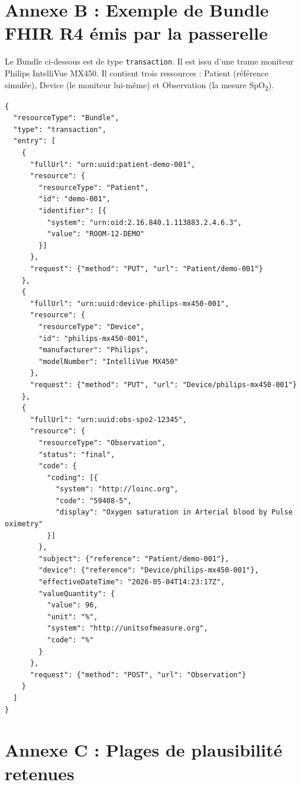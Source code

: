 \section*{Annexe B : Exemple de Bundle FHIR R4 émis par la passerelle}
\label{sec:annexe-bundle-fhir}

Le Bundle ci-dessous est de type \texttt{transaction}. Il est issu d'une trame moniteur Philips IntelliVue MX450. Il contient trois ressources : Patient (référence simulée), Device (le moniteur lui-même) et Observation (la mesure SpO\textsubscript{2}).

\begin{lstlisting}[style=bridgejson, caption={Bundle FHIR R4 transaction émis par la passerelle pour une mesure SpO2.}, label={lst:bundle-fhir}]
{
  "resourceType": "Bundle",
  "type": "transaction",
  "entry": [
    {
      "fullUrl": "urn:uuid:patient-demo-001",
      "resource": {
        "resourceType": "Patient",
        "id": "demo-001",
        "identifier": [{
          "system": "urn:oid:2.16.840.1.113883.2.4.6.3",
          "value": "ROOM-12-DEMO"
        }]
      },
      "request": {"method": "PUT", "url": "Patient/demo-001"}
    },
    {
      "fullUrl": "urn:uuid:device-philips-mx450-001",
      "resource": {
        "resourceType": "Device",
        "id": "philips-mx450-001",
        "manufacturer": "Philips",
        "modelNumber": "IntelliVue MX450"
      },
      "request": {"method": "PUT", "url": "Device/philips-mx450-001"}
    },
    {
      "fullUrl": "urn:uuid:obs-spo2-12345",
      "resource": {
        "resourceType": "Observation",
        "status": "final",
        "code": {
          "coding": [{
            "system": "http://loinc.org",
            "code": "59408-5",
            "display": "Oxygen saturation in Arterial blood by Pulse oximetry"
          }]
        },
        "subject": {"reference": "Patient/demo-001"},
        "device": {"reference": "Device/philips-mx450-001"},
        "effectiveDateTime": "2026-05-04T14:23:17Z",
        "valueQuantity": {
          "value": 96,
          "unit": "%",
          "system": "http://unitsofmeasure.org",
          "code": "%"
        }
      },
      "request": {"method": "POST", "url": "Observation"}
    }
  ]
}
\end{lstlisting}

\section*{Annexe C : Plages de plausibilité retenues}
\label{sec:annexe-plausibilite}

